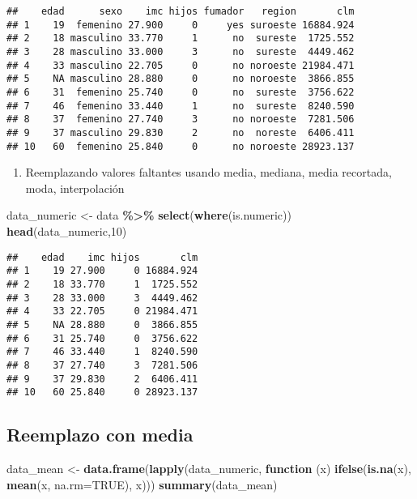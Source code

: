 \documentclass[
]{article}
\newenvironment{Shaded}{\begin{snugshade}}{\end{snugshade}}
\newcommand{\AttributeTok}[1]{\textcolor[rgb]{0.13,0.29,0.53}{#1}}
\newcommand{\ConstantTok}[1]{\textcolor[rgb]{0.56,0.35,0.01}{#1}}
\newcommand{\ControlFlowTok}[1]{\textcolor[rgb]{0.13,0.29,0.53}{\textbf{#1}}}
\newcommand{\DecValTok}[1]{\textcolor[rgb]{0.00,0.00,0.81}{#1}}
\newcommand{\FunctionTok}[1]{\textcolor[rgb]{0.13,0.29,0.53}{\textbf{#1}}}
\newcommand{\NormalTok}[1]{#1}
\newcommand{\OtherTok}[1]{\textcolor[rgb]{0.56,0.35,0.01}{#1}}
\newcommand{\SpecialCharTok}[1]{\textcolor[rgb]{0.81,0.36,0.00}{\textbf{#1}}}
\providecommand{\tightlist}{%
  \setlength{\itemsep}{0pt}\setlength{\parskip}{0pt}}
\begin{document}
\begin{verbatim}
##    edad      sexo    imc hijos fumador   region       clm
## 1    19  femenino 27.900     0     yes suroeste 16884.924
## 2    18 masculino 33.770     1      no  sureste  1725.552
## 3    28 masculino 33.000     3      no  sureste  4449.462
## 4    33 masculino 22.705     0      no noroeste 21984.471
## 5    NA masculino 28.880     0      no noroeste  3866.855
## 6    31  femenino 25.740     0      no  sureste  3756.622
## 7    46  femenino 33.440     1      no  sureste  8240.590
## 8    37  femenino 27.740     3      no noroeste  7281.506
## 9    37 masculino 29.830     2      no  noreste  6406.411
## 10   60  femenino 25.840     0      no noroeste 28923.137
\end{verbatim}

\begin{enumerate}
\def\labelenumi{\arabic{enumi}.}
\setcounter{enumi}{2}
\tightlist
\item
  Reemplazando valores faltantes usando media, mediana, media recortada,
  moda, interpolación
\end{enumerate}

\begin{Shaded}
\begin{Highlighting}[]
\NormalTok{data\_numeric }\OtherTok{\textless{}{-}}\NormalTok{ data }\SpecialCharTok{\%\textgreater{}\%} \FunctionTok{select}\NormalTok{(}\FunctionTok{where}\NormalTok{(is.numeric))}
\FunctionTok{head}\NormalTok{(data\_numeric,}\DecValTok{10}\NormalTok{)}
\end{Highlighting}
\end{Shaded}

\begin{verbatim}
##    edad    imc hijos       clm
## 1    19 27.900     0 16884.924
## 2    18 33.770     1  1725.552
## 3    28 33.000     3  4449.462
## 4    33 22.705     0 21984.471
## 5    NA 28.880     0  3866.855
## 6    31 25.740     0  3756.622
## 7    46 33.440     1  8240.590
## 8    37 27.740     3  7281.506
## 9    37 29.830     2  6406.411
## 10   60 25.840     0 28923.137
\end{verbatim}

\subsection{Reemplazo con media}\label{reemplazo-con-media}

\begin{Shaded}
\begin{Highlighting}[]
\NormalTok{data\_mean }\OtherTok{\textless{}{-}} \FunctionTok{data.frame}\NormalTok{(}\FunctionTok{lapply}\NormalTok{(data\_numeric, }\ControlFlowTok{function}\NormalTok{ (x) }\FunctionTok{ifelse}\NormalTok{(}\FunctionTok{is.na}\NormalTok{(x), }\FunctionTok{mean}\NormalTok{(x, }\AttributeTok{na.rm=}\ConstantTok{TRUE}\NormalTok{), x)))}
\FunctionTok{summary}\NormalTok{(data\_mean)}
\end{Highlighting}
\end{Shaded}
\end{document}
